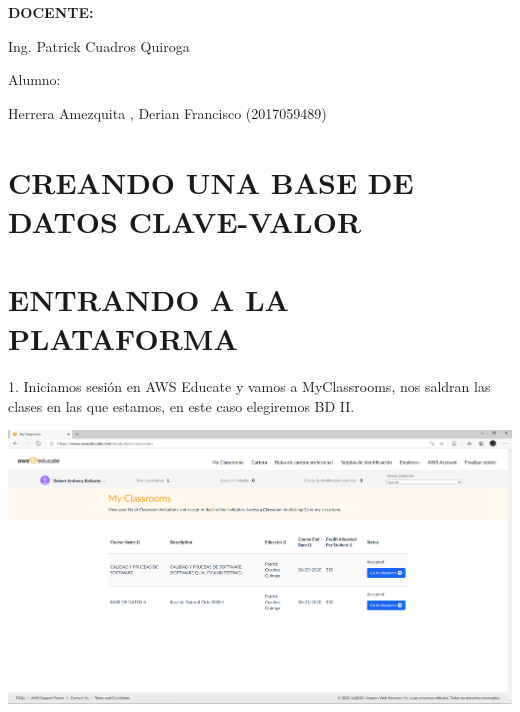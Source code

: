 \documentclass[12pt,letterpaper]{article}
\begin{document}
\begin{titlepage}
\begin{center}
\vspace*{0.3in}
\begin{Large}
\textbf{DOCENTE:} \\
\end{Large}

\vspace*{0.1in}
\begin{large}
Ing. Patrick Cuadros Quiroga\\
\end{large}

\vspace*{0.2in}
\vspace*{0.1in}
\begin{large}
Alumno: \\
\begin{flushleft}
 Herrera Amezquita , Derian Francisco		\hfill	(2017059489) \\


\end{flushleft}
\end{large}
\end{center}

\end{titlepage}



\tableofcontents %
\thispagestyle{empty} %
\newpage
\setcounter{page}{1} %



\section{ CREANDO UNA BASE DE DATOS CLAVE-VALOR} 
\section*{ENTRANDO A LA PLATAFORMA}
1.	Iniciamos sesión en AWS Educate y vamos a MyClassrooms, nos saldran las clases en las que estamos, en este caso elegiremos BD II.


\begin{center}
    \includegraphics[width=15cm]{img/1.png}  
\end{center}
\end{document}
